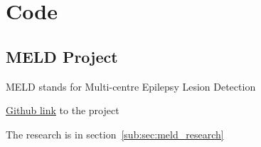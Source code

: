 \chapter{Code}

\section{MELD Project}
\label{sub:sec:meld_github}

MELD stands for Multi-centre Epilepsy Lesion Detection

\href{https://meldproject.github.io/}{Github link} to the project

The research is in section~\ref{sub:sec:meld_research}
